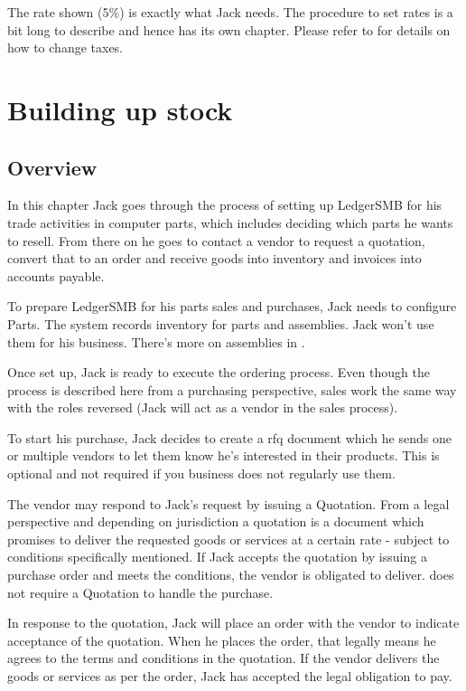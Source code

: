 The rate shown (5\%) is exactly what Jack needs. The procedure to set rates is a bit
long to describe and hence has its own chapter. Please refer to  for
details on how to change taxes.

\chapter{Building up stock}
\label{cha-building-up-stock}

\section{Overview}
\label{sec-stock-overview}

In this chapter Jack goes through the process of setting up LedgerSMB for his
trade activities in computer parts, which includes deciding which parts he wants to
resell. From there on he goes to contact a vendor to request a quotation, convert that
to an order and receive goods into inventory and invoices into accounts payable.

To prepare LedgerSMB for his parts sales and purchases, Jack needs to configure Parts.
The system records inventory for parts and assemblies. Jack won't use them for his
business. There's more on assemblies in .

Once set up, Jack is ready to execute the ordering process. Even though the process
is described here from a purchasing perspective, sales work the same way with the roles
reversed (Jack will act as a vendor in the sales process).

To start his purchase, Jack decides to create a \gls{rfq} document which
he sends one or multiple vendors to let them know he's interested in their products. 
This is optional and not required if you business does not regularly use them.

The vendor may respond to Jack's request by issuing a Quotation. From a legal perspective
and depending on jurisdiction 
a quotation is a document which promises to deliver the requested goods or services at a
certain rate - subject to conditions specifically mentioned. If Jack accepts the quotation by 
issuing a purchase order
and meets the conditions, the vendor is obligated to deliver. \lsmbsp does not require a 
Quotation to handle the purchase.

In response to the quotation, Jack will place an order with the vendor to indicate
acceptance of the quotation. When he places the order, that legally means he agrees to the terms
and conditions in the quotation. If the vendor delivers the goods or services as per the
order, Jack has accepted the legal obligation to pay.

